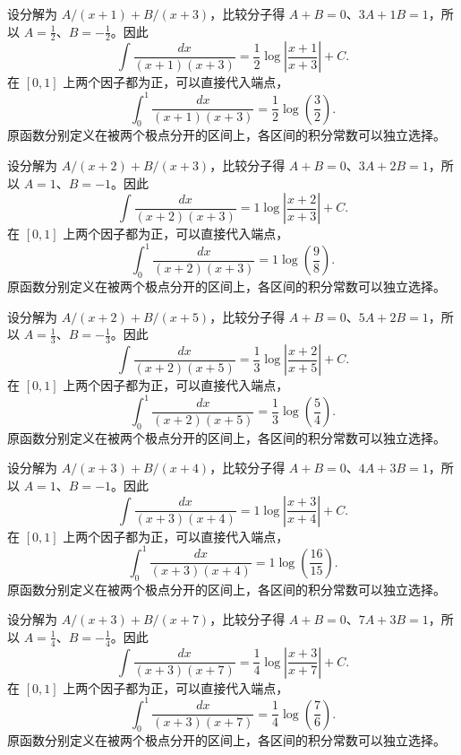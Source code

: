 \documentclass[UTF8,12pt,a4paper,fontset=fandol]{ctexart}
\begin{document}
\begin{solve}\label{ans:c13q14}
设分解为 $A/(x+1)+B/(x+3)$，比较分子得 $A+B=0$、$3A+1B=1$，所以 $A=\frac{1}{2}$、$B=-\frac{1}{2}$。因此
\[
\int\frac{dx}{(x+1)(x+3)}=\frac{1}{2}\log\left|\frac{x+1}{x+3}\right|+C.
\]
在 $[0,1]$ 上两个因子都为正，可以直接代入端点，
\[
\int_0^1\frac{dx}{(x+1)(x+3)}=\frac{1}{2}\log\left(\frac{3}{2}\right).
\]
原函数分别定义在被两个极点分开的区间上，各区间的积分常数可以独立选择。
\end{solve}

\begin{solve}\label{ans:c13q15}
设分解为 $A/(x+2)+B/(x+3)$，比较分子得 $A+B=0$、$3A+2B=1$，所以 $A=1$、$B=-1$。因此
\[
\int\frac{dx}{(x+2)(x+3)}=1\log\left|\frac{x+2}{x+3}\right|+C.
\]
在 $[0,1]$ 上两个因子都为正，可以直接代入端点，
\[
\int_0^1\frac{dx}{(x+2)(x+3)}=1\log\left(\frac{9}{8}\right).
\]
原函数分别定义在被两个极点分开的区间上，各区间的积分常数可以独立选择。
\end{solve}

\begin{solve}\label{ans:c13q16}
设分解为 $A/(x+2)+B/(x+5)$，比较分子得 $A+B=0$、$5A+2B=1$，所以 $A=\frac{1}{3}$、$B=-\frac{1}{3}$。因此
\[
\int\frac{dx}{(x+2)(x+5)}=\frac{1}{3}\log\left|\frac{x+2}{x+5}\right|+C.
\]
在 $[0,1]$ 上两个因子都为正，可以直接代入端点，
\[
\int_0^1\frac{dx}{(x+2)(x+5)}=\frac{1}{3}\log\left(\frac{5}{4}\right).
\]
原函数分别定义在被两个极点分开的区间上，各区间的积分常数可以独立选择。
\end{solve}

\begin{solve}\label{ans:c13q17}
设分解为 $A/(x+3)+B/(x+4)$，比较分子得 $A+B=0$、$4A+3B=1$，所以 $A=1$、$B=-1$。因此
\[
\int\frac{dx}{(x+3)(x+4)}=1\log\left|\frac{x+3}{x+4}\right|+C.
\]
在 $[0,1]$ 上两个因子都为正，可以直接代入端点，
\[
\int_0^1\frac{dx}{(x+3)(x+4)}=1\log\left(\frac{16}{15}\right).
\]
原函数分别定义在被两个极点分开的区间上，各区间的积分常数可以独立选择。
\end{solve}

\begin{solve}\label{ans:c13q18}
设分解为 $A/(x+3)+B/(x+7)$，比较分子得 $A+B=0$、$7A+3B=1$，所以 $A=\frac{1}{4}$、$B=-\frac{1}{4}$。因此
\[
\int\frac{dx}{(x+3)(x+7)}=\frac{1}{4}\log\left|\frac{x+3}{x+7}\right|+C.
\]
在 $[0,1]$ 上两个因子都为正，可以直接代入端点，
\[
\int_0^1\frac{dx}{(x+3)(x+7)}=\frac{1}{4}\log\left(\frac{7}{6}\right).
\]
原函数分别定义在被两个极点分开的区间上，各区间的积分常数可以独立选择。
\end{solve}
\end{document}
